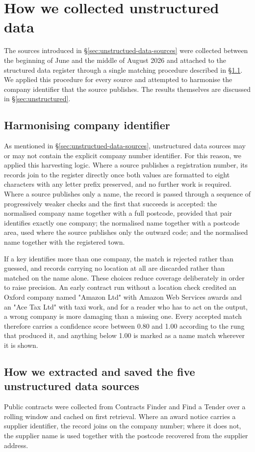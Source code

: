 \documentclass[    author={Samuel Menon Demelo; Sneha Saphala Ram Prasad; 
Viktor Ander Lindholm; Vishal Khatri},
               supervisor={Prof. Fernando Moreno-Pino},
                   degree={MSc},
                    title={Lloyds Commercial Banking Intelligence},
                 subtitle={Ranking SME Lending, Risk and Growth Prospects for Lloyds Banking Group},
                     type={},
                     year={2026}]{dissertation}
\begin{document}
\section{How we collected unstructured data}
\label{sec:unstructured-method}
The sources introduced in \S\ref{sec:unstructued-data-sources} were collected between the beginning of June and the middle of August 2026 and attached to the structured data register through a single matching procedure described in \S\ref{sec:matching-ladder}. We applied this procedure for every source and attempted to harmonise the company identifier that the source publishes. The results themselves are discussed in \S\ref{sec:unstructured}.

\subsection{Harmonising company identifier}
\label{sec:matching-ladder}
As mentioned in \S\ref{sec:unstructued-data-sources}, unstructured data sources may or may not contain the explicit company number identifier. For this reason, we applied this harvesting logic.
Where a source publishes a registration number, its records join to the register directly once both values are formatted to eight characters with any letter prefix preserved, and no further work is required. Where a source publishes only a name, the record is passed through a sequence of progressively weaker checks and the first that succeeds is accepted: the normalised company name together with a full postcode, provided that pair identifies exactly one company; the normalised name together with a postcode area, used where the source publishes only the outward code; and the normalised name together with the registered town.

If a key identifies more than one company, the match is rejected rather than guessed, and records carrying no location at all are discarded rather than matched on the name alone. These choices reduce coverage deliberately in order to raise precision. An early contract run without a location check credited an Oxford company named "Amazon Ltd" with Amazon Web Services awards and an "Ace Tax Ltd" with taxi work, and for a reader who has to act on the output, a wrong company is more damaging than a missing one. Every accepted match therefore carries a confidence score between 0.80 and 1.00 according to the rung that produced it, and anything below 1.00 is marked as a name match wherever it is shown.

\subsection{How we extracted and saved the five unstructured data sources}
\label{sec:public-sources}
Public contracts were collected from Contracts Finder and Find a Tender over a rolling window and cached on first retrieval. Where an award notice carries a supplier identifier, the record joins on the company number; where it does not, the supplier name is used together with the postcode recovered from the supplier address.
\end{document}

